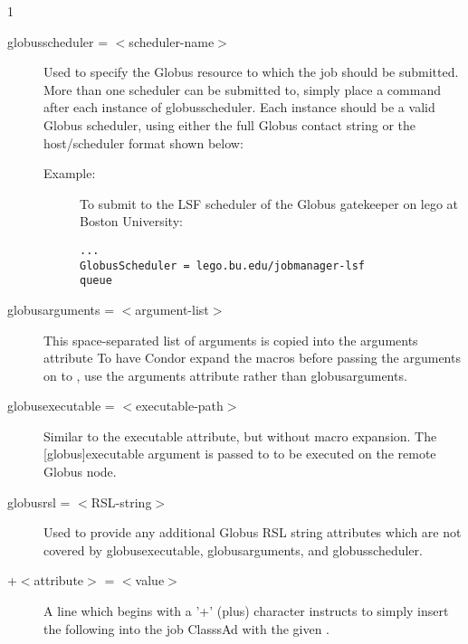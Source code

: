 \begin{ManPage}{\label{man-condor-submit}}{1}
\begin{description}

\item[globusscheduler = $<$scheduler-name$>$] Used to specify the 
Globus resource to which the job should be submitted. More than one scheduler
can be submitted to, simply place a  command after each instance
of globusscheduler. Each instance should be a valid Globus scheduler, using
either the full Globus contact string or the host/scheduler format shown below:
\begin{description}
\item[Example:]
To submit to the LSF scheduler of the Globus gatekeeper on lego at 
Boston University:
\begin{verbatim}
...
GlobusScheduler = lego.bu.edu/jobmanager-lsf
queue
\end{verbatim}
\end{description}


\item[globusarguments = $<$argument-list$>$] This space-separated list
of arguments is copied into the  arguments attribute 
To have Condor expand the macros before passing the arguments on to 
, use the arguments attribute rather than globusarguments.


\item[globusexecutable = $<$executable-path$>$] Similar to the executable
attribute, but without macro expansion. The [globus]executable argument
is passed to  to be executed on the remote Globus node.


\item[globusrsl = $<$RSL-string$>$] Used to provide any additional Globus RSL
string attributes which are not covered by globusexecutable, globusarguments,
and globusscheduler.


\item[+$<$attribute$>$ = $<$value$>$] A line which begins with a '+'
(plus) character instructs  to simply insert the
following  into the job ClasssAd with the given 
. 


\end{description}
\end{ManPage}
